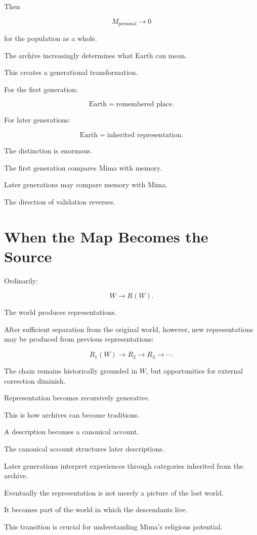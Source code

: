 \documentclass[11pt,oneside]{book}
\theoremstyle{definition}
\theoremstyle{remark}
\begin{document}
Then

\[
M_{\mathrm{personal}}\rightarrow0
\]

for the population as a whole.

The archive increasingly determines what Earth can mean.

This creates a generational transformation.

For the first generation:

\[
\text{Earth}=\text{remembered place}.
\]

For later generations:

\[
\text{Earth}=\text{inherited representation}.
\]

The distinction is enormous.

The first generation compares Mima with memory.

Later generations may compare memory with Mima.

The direction of validation reverses.

\section{When the Map Becomes the Source}

Ordinarily:

\[
W\rightarrow R(W).
\]

The world produces representations.

After sufficient separation from the original world, however, new representations may be produced from previous representations:

\[
R_1(W)
\rightarrow
R_2
\rightarrow
R_3
\rightarrow\cdots.
\]

The chain remains historically grounded in \(W\), but opportunities for external correction diminish.

Representation becomes recursively generative.

This is how archives can become traditions.

A description becomes a canonical account.

The canonical account structures later descriptions.

Later generations interpret experiences through categories inherited from the archive.

Eventually the representation is not merely a picture of the lost world.

It becomes part of the world in which the descendants live.

This transition is crucial for understanding Mima's religious potential.
\end{document}
